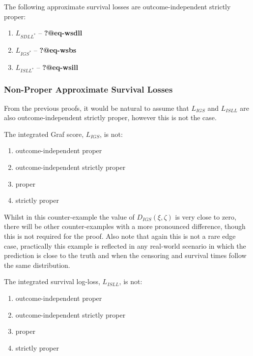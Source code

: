 \documentclass[
  letterpaper,
]{scrbook}
\providecommand{\tightlist}{%
  \setlength{\itemsep}{0pt}\setlength{\parskip}{0pt}}\usepackage{longtable,booktabs,array}
\theoremstyle{plain}
\theoremstyle{definition}
\theoremstyle{remark}
\begin{document}
\leavevmode{}%
\label{prop:approx_proper_losses} The following approximate survival
losses are outcome-independent strictly proper:

\begin{enumerate}
\def\labelenumi{\roman{enumi}.}
\tightlist
\item
  \(L_{SDLL^*}\) -- \textbf{?@eq-wsdll}
\item
  \(L_{IGS^*}\) -- \textbf{?@eq-wsbs}
\item
  \(L_{ISLL^*}\) -- \textbf{?@eq-wsill}
\end{enumerate}

\hypertarget{sec-eval-distr-score-proper-nonapprox}{%
\subsubsection{Non-Proper Approximate Survival
Losses}\label{sec-eval-distr-score-proper-nonapprox}}

From the previous proofs, it would be natural to assume that \(L_{IGS}\)
and \(L_{ISLL}\) are also outcome-independent strictly proper, however
this is not the case.

\leavevmode{}%
\label{prop:eval_igs} The integrated Graf score, \(L_{IGS}\), is not:

\begin{enumerate}
\def\labelenumi{\roman{enumi}.}
\tightlist
\item
  outcome-independent proper
\item
  outcome-independent strictly proper
\item
  proper
\item
  strictly proper
\end{enumerate}

Whilst in this counter-example the value of \(D_{IGS}(\xi, \zeta)\) is
very close to zero, there will be other counter-examples with a more
pronounced difference, though this is not required for the proof. Also
note that again this is not a rare edge case, practically this example
is reflected in any real-world scenario in which the prediction is close
to the truth and when the censoring and survival times follow the same
distribution.

\leavevmode{}%
\label{prop:eval_isll} The integrated survival log-loss, \(L_{ISLL}\),
is not:

\begin{enumerate}
\def\labelenumi{\roman{enumi}.}
\tightlist
\item
  outcome-independent proper
\item
  outcome-independent strictly proper
\item
  proper
\item
  strictly proper
\end{enumerate}
\end{document}
